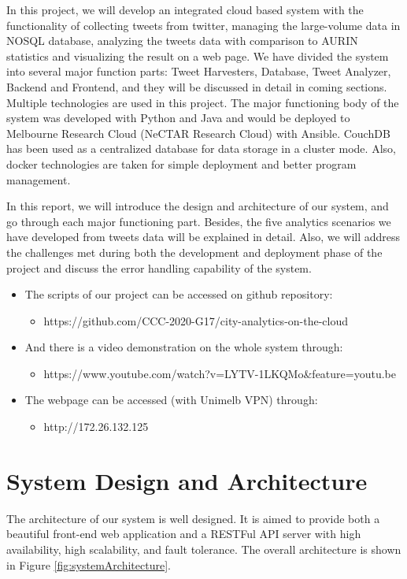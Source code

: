 \documentclass{article}
\begin{document}
In this project, we will develop an integrated cloud based system with the functionality of collecting tweets from twitter, managing the large-volume data in NOSQL database, analyzing the tweets data with comparison to AURIN statistics and visualizing the result on a web page. We have divided the system into several major function parts: Tweet Harvesters, Database, Tweet Analyzer, Backend and Frontend, and they will be discussed in detail in coming sections. Multiple technologies are used in this project. The major functioning body of the system was developed with Python and Java and would be deployed to Melbourne Research Cloud (NeCTAR Research Cloud) with Ansible. CouchDB has been used as a centralized database for data storage in a cluster mode. Also, docker technologies are taken for simple deployment and better program management. 

In this report, we will introduce the design and architecture of our system, and go through each major functioning part. Besides, the five analytics scenarios we have developed from tweets data will be explained in detail. Also, we will address the challenges met during both the development and deployment phase of the project and discuss the error handling capability of the system. \\
\newline
\begin{itemize}
	\item The scripts of our project can be accessed on github repository: 
	\begin{itemize}
		\item https://github.com/CCC-2020-G17/city-analytics-on-the-cloud
	\end{itemize}

	\item And there is a video demonstration on the whole system through:
	\begin{itemize}
		\item https://www.youtube.com/watch?v=LYTV-1LKQMo\&feature=youtu.be
	\end{itemize}
	
	\item The webpage can be accessed (with Unimelb VPN) through:
	\begin{itemize}
		\item http://172.26.132.125
	\end{itemize}
\end{itemize}


\section{System Design and Architecture}
\label{sec:systemDesignAndArchitecture}
The architecture of our system is well designed. It is aimed to provide both a beautiful front-end web application and a RESTFul API server with high availability, high scalability, and fault tolerance. The overall architecture is shown in Figure \ref{fig:systemArchitecture}. 
\end{document}

